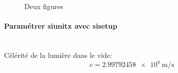 				\begin{figure}
					\centering
					\caption{Deux figures}
					\label{fig:deux_figures}
				\end{figure}

			\paragraph{Paramétrer siunitx avec sisetup}~~\\

        		Célérité de la lumière dans le vide: $$c=\SI{2.99792458e8}{\meter\per\second}$$
